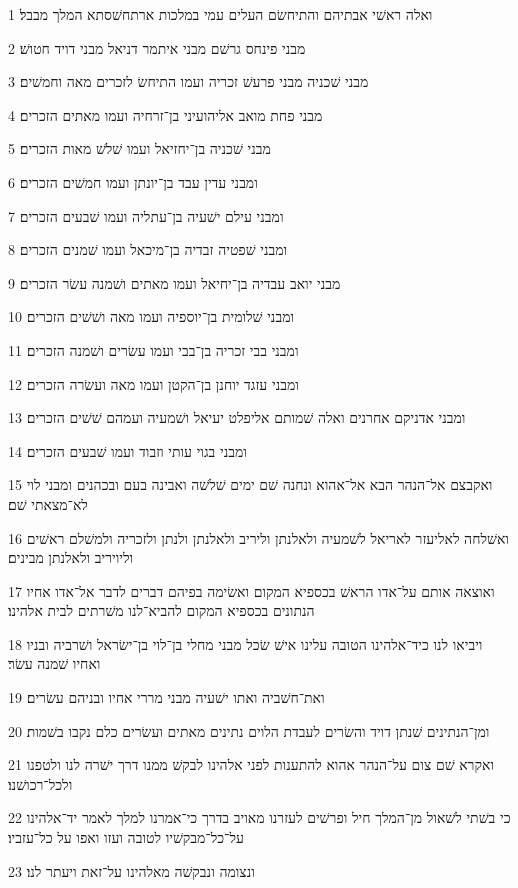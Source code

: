 \par 1 ואלה ראשׁי אבתיהם והתיחשׂם העלים עמי במלכות ארתחשׁסתא המלך מבבל׃
\par 2 מבני פינחס גרשׁם מבני איתמר דניאל מבני דויד חטושׁ׃
\par 3 מבני שׁכניה מבני פרעשׁ זכריה ועמו התיחשׂ לזכרים מאה וחמשׁים׃
\par 4 מבני פחת מואב אליהועיני בן־זרחיה ועמו מאתים הזכרים׃
\par 5 מבני שׁכניה בן־יחזיאל ועמו שׁלשׁ מאות הזכרים׃
\par 6 ומבני עדין עבד בן־יונתן ועמו חמשׁים הזכרים׃
\par 7 ומבני עילם ישׁעיה בן־עתליה ועמו שׁבעים הזכרים׃
\par 8 ומבני שׁפטיה זבדיה בן־מיכאל ועמו שׁמנים הזכרים׃
\par 9 מבני יואב עבדיה בן־יחיאל ועמו מאתים ושׁמנה עשׂר הזכרים׃
\par 10 ומבני שׁלומית בן־יוספיה ועמו מאה ושׁשׁים הזכרים׃
\par 11 ומבני בבי זכריה בן־בבי ועמו עשׂרים ושׁמנה הזכרים׃
\par 12 ומבני עזגד יוחנן בן־הקטן ועמו מאה ועשׂרה הזכרים׃
\par 13 ומבני אדניקם אחרנים ואלה שׁמותם אליפלט יעיאל ושׁמעיה ועמהם שׁשׁים הזכרים׃
\par 14 ומבני בגוי עותי וזבוד ועמו שׁבעים הזכרים׃
\par 15 ואקבצם אל־הנהר הבא אל־אהוא ונחנה שׁם ימים שׁלשׁה ואבינה בעם ובכהנים ומבני לוי לא־מצאתי שׁם׃
\par 16 ואשׁלחה לאליעזר לאריאל לשׁמעיה ולאלנתן וליריב ולאלנתן ולנתן ולזכריה ולמשׁלם ראשׁים וליויריב ולאלנתן מבינים׃
\par 17 ואוצאה אותם על־אדו הראשׁ בכספיא המקום ואשׂימה בפיהם דברים לדבר אל־אדו אחיו הנתונים בכספיא המקום להביא־לנו משׁרתים לבית אלהינו׃
\par 18 ויביאו לנו כיד־אלהינו הטובה עלינו אישׁ שׂכל מבני מחלי בן־לוי בן־ישׂראל ושׁרביה ובניו ואחיו שׁמנה עשׂר׃
\par 19 ואת־חשׁביה ואתו ישׁעיה מבני מררי אחיו ובניהם עשׂרים׃
\par 20 ומן־הנתינים שׁנתן דויד והשׂרים לעבדת הלוים נתינים מאתים ועשׂרים כלם נקבו בשׁמות׃
\par 21 ואקרא שׁם צום על־הנהר אהוא להתענות לפני אלהינו לבקשׁ ממנו דרך ישׁרה לנו ולטפנו ולכל־רכושׁנו׃
\par 22 כי בשׁתי לשׁאול מן־המלך חיל ופרשׁים לעזרנו מאויב בדרך כי־אמרנו למלך לאמר יד־אלהינו על־כל־מבקשׁיו לטובה ועזו ואפו על כל־עזביו׃
\par 23 ונצומה ונבקשׁה מאלהינו על־זאת ויעתר לנו׃
